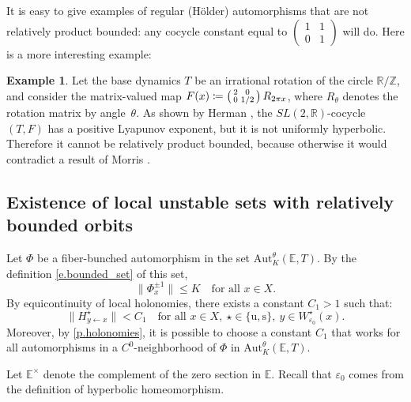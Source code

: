\documentclass[JEP,XML,SOM,Unicode]{cedram}
\def\vcentcolon{\mathrel{\mathop\ordinarycolon}}
\providecommand\ordinarycolon{:}
\providecommand*\coloneqq{\vcentcolon\mathrel{\mkern-1.2mu}=}
\theoremstyle{plain}
\theoremstyle{definition}
\newtheorem{example}[theorem]{Example}
\newcommand{\RR}{\mathbb{R}}
\newcommand{\ZZ}{\mathbb{Z}}
\newcommand{\EE}{\mathbb{E}}
\newcommand{\SL}{\mathit{SL}}
\newcommand{\uu}{\mathrm{u}}
\renewcommand{\ss}{\mathrm{s}}
\newcommand{\Aut}{\mathrm{Aut}}
\let\epsilon\varepsilon
\begin{document}
It is easy to give examples of regular (\eg Hölder) automorphisms that are not relatively product bounded: any cocycle constant equal to $\left( \begin{smallmatrix} 1 & 1 \\ 0 & 1 \end{smallmatrix} \right)$ will do.
Here is a more interesting example:

\begin{example}\label{ex.Herman}
Let the base dynamics $T$ be an irrational rotation of the circle $\RR/\ZZ$, and consider the matrix-valued map $F(x) \coloneqq \left( \begin{smallmatrix} 2 & 0 \\ 0 & 1/2 \end{smallmatrix} \right) R_{2\pi x}$, where $R_\theta$ denotes the rotation matrix by angle~$\theta$. As shown by Herman \cite[p.\,471--473]{Herman}, the $\SL(2,\RR)$-cocycle $(T,F)$ has a positive Lyapunov exponent, but it is not uniformly hyperbolic. Therefore it cannot be relatively product bounded, because otherwise it would contradict a result of Morris \cite[Th.\,2.1]{Morris_rapidly}.
\end{example}

\subsection{Existence of local unstable sets with relatively bounded orbits}\label{ss.local_RPB}

Let $\Phi$ be a fiber-bunched automorphism in the set $\Aut^\theta_K(\EE,T)$.
By the definition \eqref{e.bounded_set} of this set,
\begin{equation}\label{e.bound_Phi}
\|\Phi^{\pm 1}_x\| \le K \quad \text{for all } x \in X.
\end{equation}
By equicontinuity of local holonomies, there exists a constant $C_1 > 1$ such that:
\begin{equation}\label{e.bound_H}
\|H^\star_{y \gets x}\| < C_1
\quad \text{for all } x \in X, \ \star \in \{\uu,\ss\}, \ y \in W^\star_{\epsilon_0}(x).
\end{equation}
Moreover, by \cref{p.holonomies}, it is possible to choose a constant $C_1$ that works for all automorphisms in a $C^0$-neighborhood of $\Phi$ in $\Aut^\theta_K(\EE,T)$.

Let $\EE^\times$ denote the complement of the zero section in $\EE$.
Recall that $\epsilon_0$ comes from the definition of hyperbolic homeomorphism.
\end{document}
